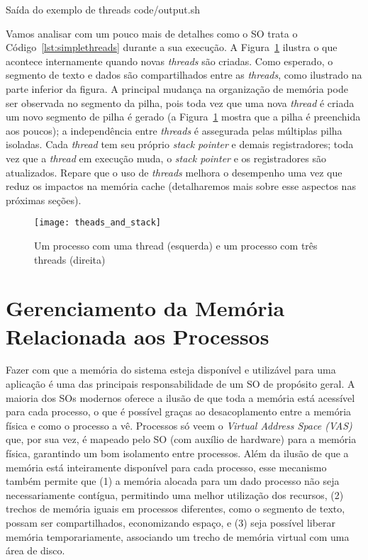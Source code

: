 \begin{ruledcaption}{Saída do exemplo de threads\label{lst:simpleThreadOutput}}
 {code/output.sh}
\end{ruledcaption}

Vamos analisar com um pouco mais de detalhes como o SO trata o
Código~\ref{lst:simplethreads} durante a sua execução. A
Figura~\ref{fig:stack_threads} ilustra o que acontece internamente quando novas
\emph{threads} são criadas. Como esperado, o segmento de texto e dados são
compartilhados entre as \emph{threads}, como ilustrado na parte inferior da
figura. A principal mudança na organização de memória pode ser observada no
segmento da pilha, pois toda vez que uma nova \emph{thread} é criada um
novo segmento de pilha é gerado (a Figura~\ref{fig:stack_threads} mostra
que a pilha é preenchida aos poucos); a independência entre
\emph{threads} é assegurada pelas múltiplas pilha isoladas. Cada \emph{thread}
tem seu próprio \emph{stack pointer} e demais registradores; toda vez que a
\emph{thread} em execução muda, o \emph{stack pointer} e os registradores são
atualizados. Repare que o uso de \emph{threads} melhora o desempenho uma vez
que reduz os impactos na memória cache (detalharemos mais sobre esse aspectos
nas próximas seções).

\begin{figure}[!h]
  \centering
  \texttt{[image: theads\_and\_stack]} 
	\caption[Um processo com uma thread e um processo com três threads]{Um processo com uma thread (esquerda) e um processo com três threads (direita)}
  \label{fig:stack_threads} 
\end{figure}

\section{Gerenciamento da Memória Relacionada aos Processos}

Fazer com que a memória do sistema esteja disponível e utilizável para uma
aplicação é uma das principais responsabilidade de um SO de propósito geral. A
maioria dos SOs modernos oferece a ilusão de que toda a memória está acessível
para cada processo, o que é possível graças ao desacoplamento entre a memória
física e como o processo a vê. Processos só veem o \emph{Virtual Address Space
(VAS)} que, por sua vez, é mapeado pelo SO (com auxílio de hardware) para a
memória física, garantindo um bom isolamento entre processos. Além da ilusão de
que a memória está inteiramente disponível para cada processo, esse mecanismo
também permite que (1) a memória alocada para um dado processo não seja
necessariamente contígua, permitindo uma melhor utilização dos recursos, (2)
trechos de memória iguais em processos diferentes, como o segmento de texto,
possam ser compartilhados, economizando espaço, e (3) seja possível liberar
memória temporariamente, associando um trecho de memória virtual com uma área
de disco.

